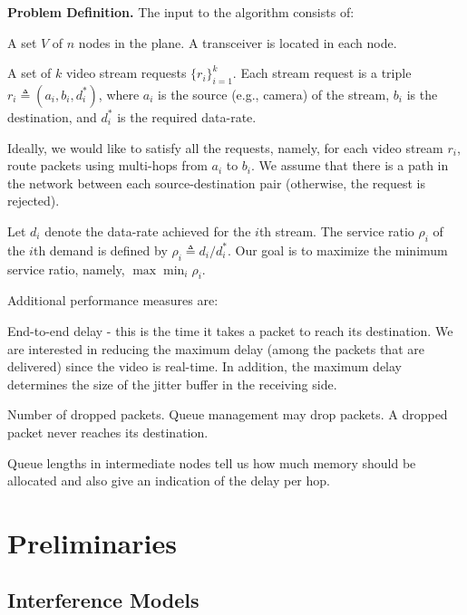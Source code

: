 \documentclass[11pt]{article}
\newenvironment{proof sketch}[1]{\noindent {\emph{Proof sketch of #1:}}}{\hfill \qed}
\newcommand{\eqdf}{\triangleq}
\begin{document}
\medskip
\noindent
\textbf{Problem Definition.}  The input to the algorithm consists of:
\begin{inparaenum}[(I)]%
\item A set $V$ of $n$ nodes in the plane. A transceiver is located in
  each node.
\item A set of $k$ video stream requests $\{r_i\}_{i=1}^k$. Each
  stream request is a triple $r_i\eqdf (a_i,b_i,d^*_i)$, where $a_i$
  is the source (e.g., camera) of the stream, $b_i$ is the
  destination, and $d^*_i$ is the required data-rate.
\end{inparaenum}%
Ideally, we would like to satisfy all the requests, namely, for each
video stream $r_i$, route packets using multi-hops from $a_i$ to
$b_i$.  We assume that there is a path in the network between each
source-destination pair (otherwise, the request is rejected).

Let $d_i$ denote the data-rate achieved for the $i$th stream.  The
service ratio $\rho_i$ of the $i$th demand is defined by $\rho_i \eqdf
d_i/d^*_i$.  Our goal is to maximize the minimum service ratio,
namely, $\max \min_i \rho_i$.

Additional performance measures are:
\begin{inparaenum}[(i)]
\item End-to-end delay - this is the time it takes a packet to reach
  its destination. We are interested in reducing the maximum delay
  (among the packets that are delivered) since the video is real-time.
  In addition, the maximum delay determines the size of the jitter
  buffer in the receiving side.
\item Number of dropped packets. Queue management may drop packets. A
  dropped packet never reaches its destination.
\item Queue lengths in intermediate nodes tell us how much memory
  should be allocated and also give an indication of the delay per
  hop.
\end{inparaenum}

\section{Preliminaries}
\label{sec:prelim}

\subsection{Interference Models}\label{sec:models}
\end{document}
